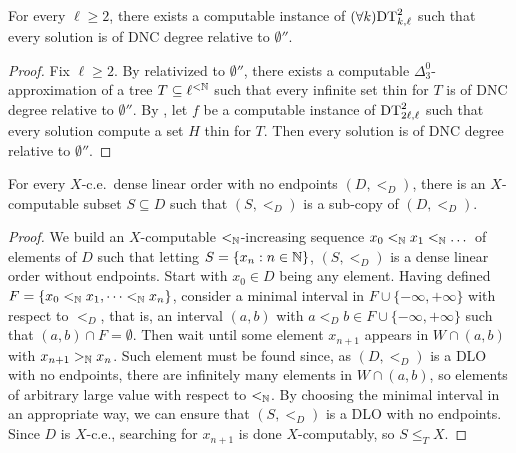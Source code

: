 \begin{corollary}\label{cor:dt2-implies-dnczpp}
For every $\ell \geq 2$, there exists a computable instance of $(\forall k)\mathrm{DT}^{2}_{k,\ell}$ such that every solution is of DNC degree relative to $\emptyset''$.
\end{corollary}
\begin{proof}
Fix $\ell \geq 2$.
  By  relativized to $\emptyset''$, there exists a computable
  $\Delta^0_3$-approximation of a tree $T \subseteq \ell^{<\mathbb{N}}$ %
  such that every infinite set thin for $T$ is of DNC degree relative to $\emptyset''$. By
  , let $f$ be a computable instance of $\mathrm{DT}^{2}_{2\ell,\ell}$ such
  that every solution compute a set $H$ thin for $T$. Then every solution is of DNC degree relative to $\emptyset''$.
  \end{proof}

\begin{lemma}\label{lem:ce-dlo-has-computable-subcopy}
For every $X$-c.e.\ dense linear order with no endpoints $(D, <_D)$,
there is an $X$-computable subset $S \subseteq D$ such that $(S, <_D)$ is a sub-copy of $(D, <_D)$.
\end{lemma}
\begin{proof}
We build an $X$-computable $<_{\mathbb{N}}$-increasing sequence $x_0 <_{\mathbb{N}} x_1 <_{\mathbb{N}} \dots$ of elements of $D$ such that letting $S = \{x_n: n \in \mathbb{N}\}$, $(S, <_D)$ is a dense linear order without endpoints. Start with $x_0 \in D$ being any element. Having defined $F = \{x_0 <_{\mathbb{N}} x_1, \dots <_{\mathbb{N}} x_n\}$,
consider a minimal interval in $F \cup \{-\infty, +\infty\}$ with respect to $<_D$, that is, an interval $(a, b)$ with $a <_D b \in F \cup \{-\infty, +\infty\}$ such that $(a, b) \cap F = \emptyset$. Then wait until some element $x_{n+1}$ appears in $W \cap (a, b)$ with $x_{n+1} >_{\mathbb{N}} x_n$. Such element must be found since, as $(D, <_D)$ is a DLO with no endpoints, there are infinitely many elements in $W \cap (a, b)$, so elements of arbitrary large value with respect to $<_{\mathbb{N}}$. By choosing the minimal interval in an appropriate way, we can ensure that $(S, <_D)$ is a DLO with no endpoints. Since $D$ is $X$-c.e., searching for $x_{n+1}$ is done $X$-computably, so $S \leq_T X$.
\end{proof}

